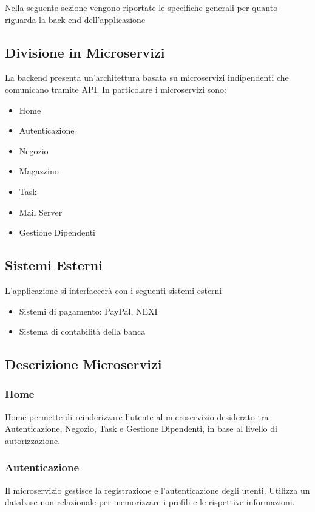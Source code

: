 \documentclass{report}
\begin{document}
Nella seguente sezione vengono riportate le specifiche generali per quanto riguarda la back-end dell’applicazione

\subsection{Divisione in Microservizi}

La backend presenta un’architettura basata su microservizi indipendenti che comunicano tramite API. In particolare i microservizi sono:
\begin{itemize}
	\item Home
	\item Autenticazione
	\item Negozio
	\item Magazzino
	\item Task
	\item Mail Server
	\item Gestione Dipendenti
\end{itemize}

\subsection{Sistemi Esterni}
L’applicazione si interfaccerà con i seguenti sistemi esterni

\begin{itemize}
	\item Sistemi di pagamento: PayPal, NEXI
	\item Sistema di contabilità della banca
\end{itemize}

\subsection{Descrizione Microservizi}

\subsubsection*{Home}
Home permette di reinderizzare l'utente al microservizio desiderato tra Autenticazione, Negozio, Task e Gestione Dipendenti, in base al livello di autorizzazione.

\subsubsection*{Autenticazione}
Il microservizio gestisce la registrazione e l'autenticazione degli utenti. Utilizza un database non relazionale per memorizzare i profili e le rispettive informazioni.
\end{document}
